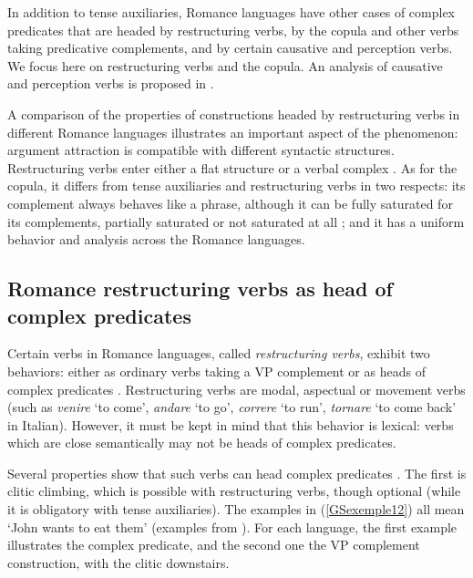 {In addition to tense auxiliaries, Romance languages have other cases of complex predicates that are headed by restructuring verbs, by the copula and other verbs taking predicative complements, and by certain causative and perception verbs. We focus here on restructuring
verbs and the copula. An analysis of causative and perception verbs is proposed in \citet{abeille1995doublestructure, AGMS98a, AG2010}. 

A comparison of the properties of constructions headed by restructuring verbs in different Romance languages illustrates an important aspect of the phenome\-non: argument attraction is compatible with different syntactic structures. Restructuring verbs enter either a flat structure or a verbal complex \citep{Monachesi98a, abeille2001deux, AG2010}. As for the copula, it differs from tense auxiliaries and restructuring verbs in two respects: its complement always behaves like a phrase, although it can be fully saturated for its complements, partially saturated or not saturated at all \citep{abeille2001varieties, AG2002b-u}; and it has a uniform behavior and analysis across the Romance languages.

\subsection{Romance restructuring verbs as head of complex predicates} \label{GSsection3.1}

Certain verbs in Romance languages, called \emph{restructuring verbs}, exhibit two behaviors: either as ordinary verbs taking a VP complement or as heads of complex predicates \citep{rizzi1982issues, aissen1983clause}. Restructuring verbs are modal, aspectual or movement verbs (such as \emph{venire} `to come’, \emph{andare} `to go’, \emph{correre} `to run’, \emph{tornare} `to come back’ in Italian). However, it must be kept in mind that this behavior is lexical: verbs which are close semantically may not be heads of complex predicates. 

Several properties show that such verbs can head complex predicates \citep[323-328]{Monachesi98a}. The first is clitic climbing, which is possible with restructuring verbs, though optional (while it is obligatory with tense auxiliaries). The examples in (\ref{GSexemple12}) all mean `John wants to eat them’ (examples from \citealt[113]{AG2010}). For each language, the first example illustrates the complex predicate, and the second one the VP complement construction, with the clitic downstairs.

}
